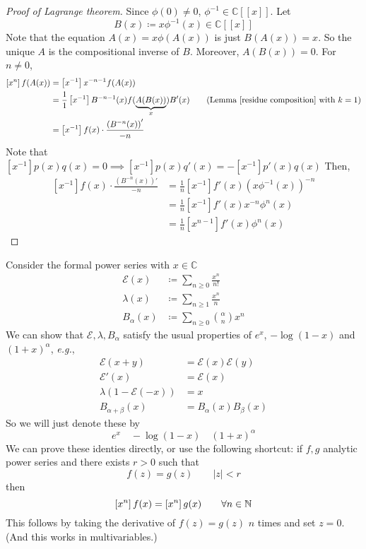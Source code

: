 \begin{proof}[Proof of Lagrange theorem]
Since \(\phi(0)\neq0\), \(\phi^{-1}\in\mathbb{C}[[x]]\).
Let
\[ B(x)\coloneqq x\phi^{-1}(x)\in\mathbb{C}[[x]] \]
Note that the equation \(A(x)=x\phi(A(x))\) is just \(B(A(x))=x\).
So the unique \(A\) is the compositional inverse of \(B\).
Moreover, \(A(B(x))=0\).
For \(n\neq0\),
\begin{align*}
\left[x^n\right]f(A(x))&=\left[x^{-1}\right]x^{-n-1}f(A(x))\\
&=\frac{1}{1}\left[x^{-1}\right]B^{-n-1}(x)f(\underbrace{A(B(x))}_{x})B'(x) \tag{Lemma \ref{residue composition} with \(k=1\)}\\
&=\left[x^{-1}\right]f(x)\cdot\frac{\left(B^{-n}(x)\right)'}{-n}
\end{align*}
Note that \(\left[x^{-1}\right]p(x)q(x)=0\implies\left[x^{-1}\right]p(x)q'(x)=-\left[x^{-1}\right]p'(x)q(x)\)
Then,
\begin{align*}
\left[x^{-1}\right]f(x)\cdot\frac{\left(B^{-n}(x)\right)'}{-n}&=\frac{1}{n}\left[x^{-1}\right]f'(x)\left(x\phi^{-1}(x)\right)^{-n}\\
&=\frac{1}{n}\left[x^{-1}\right]f'(x)x^{-n}\phi^n(x)\\
&=\frac{1}{n}\left[x^{n-1}\right]f'(x)\phi^n(x)
\end{align*}
\end{proof}


\begin{example}
Consider the formal power series with \(x\in\mathbb{C}\)
\begin{align*}
    \mathcal{E}(x)&\coloneqq\sum_{n\geq0}\frac{x^n}{n!}\\
    \lambda(x)&\coloneqq\sum_{n\geq1}\frac{x^n}{n}\\
    B_{\alpha}(x)&\coloneqq\sum_{n\geq0}\binom{\alpha}{n}x^n
\end{align*}
We can show that \(\mathcal{E},\lambda,B_\alpha\) satisfy the usual properties of \(e^x\), \(-\log(1-x)\) and \((1+x)^\alpha\), \textit{e.g.},
\begin{align*}
\mathcal{E}(x+y)&=\mathcal{E}(x)\mathcal{E}(y)\\
\mathcal{E}'(x)&=\mathcal{E}(x)\\
\lambda(1-\mathcal{E}(-x))&=x\\
B_{\alpha+\beta}(x)&=B_\alpha(x)B_\beta(x)
\end{align*}
So we will just denote these by
\[ e^x \quad -\log(1-x) \quad (1+x)^\alpha \]
We can prove these identies directly, or use the following shortcut: if \(f,g\) analytic power series and there exists \(r>0\) such that
\[ f(z)=g(z) \qquad |z|<r \]
then
\[ \left[x^n\right]f(x)=\left[x^n\right]g(x) \qquad \forall n\in\mathbb{N} \]
This follows by taking the derivative of \(f(z)=g(z)\) \(n\) times and set \(z=0\).
(And this works in multivariables.)
\end{example}

